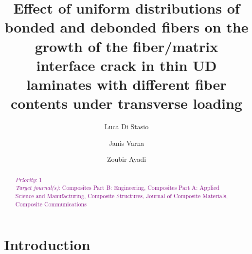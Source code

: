 \documentclass[review]{elsarticle}
\begin{document}
\begin{frontmatter}

\title{Effect of uniform distributions of bonded and debonded fibers on the growth of the fiber/matrix interface crack in thin UD laminates with different fiber contents under transverse loading}


\author[nancy,lulea]{Luca Di Stasio}
\author[lulea]{Janis Varna}
\author[nancy]{Zoubir Ayadi}


\address[nancy]{Universit\'e de Lorraine, EEIGM, IJL, 6 Rue Bastien Lepage, F-54010 Nancy, France}
\address[lulea]{Lule\aa\ University of Technology, University Campus, SE-97187 Lule\aa, Sweden}

\begin{abstract}
\noindent
\textcolor{purple}{{\em Priority}: 1}\\
\textcolor{purple}{{\em Target journal(s)}: Composites Part B: Engineering, Composites Part A: Applied Science and Manufacturing, Composite Structures, Journal of Composite Materials, Composite Communications}\\

\end{abstract}


\end{frontmatter}

\linenumbers

\section{Introduction}
\end{document}
